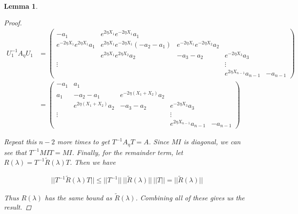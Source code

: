 \documentclass[12pt]{article}
\newtheorem{lemma}{Lemma}
\begin{document}
\begin{lemma}
\begin{proof}
\begin{align*}
U_1^{-1} A_\eta U_1 &= \begin{pmatrix}
-a_1 & e^{2 \eta X_1} e^{-2 \eta X_1} a_1 \\
e^{-2 \eta X_1} e^{2 \eta X_1} a_1 & e^{2 \eta X_1} e^{-2 \eta X_1}(-a_2 - a_1) & e^{-2 \eta X_1}e^{-2 \eta X_2} a_2 \\
& e^{2 \eta X_1} e^{2 \eta X_2} a_2 & -a_3 - a_2 & e^{-2 \eta X_3} a_3 \\
\vdots & & & \vdots \\
& & & e^{2 \eta X_{n-1}} a_{n-1} & -a_{n-1} 
\end{pmatrix}\\
&= \begin{pmatrix}
-a_1 & a_1 \\
a_1 & -a_2 - a_1 & e^{-2 \eta (X_1+X_2)} a_2 \\
& e^{2 \eta (X_1+X_2)} a_2 & -a_3 - a_2 & e^{-2 \eta X_3} a_3 \\
\vdots & & & \vdots \\
& & & e^{2 \eta X_{n-1}} a_{n-1} & -a_{n-1} 
\end{pmatrix}
\end{align*}

Repeat this $n-2$ more times to get $T^{-1} A_\eta T = A$. Since $M I$ is diagonal, we can see that $T^{-1} MI T = MI$. Finally, for the remainder term, let $R(\lambda) = T^{-1} \tilde{R}(\lambda)T$. Then we have 

\begin{align*}
||T^{-1} \tilde{R}(\lambda)T|| \leq ||T^{-1} ||\:|| \tilde{R}(\lambda)||\:||T|| = || \tilde{R}(\lambda)||
\end{align*}

Thus $R(\lambda)$ has the same bound as $\tilde{R}(\lambda)$. Combining all of these gives us the result.

\end{proof}

\end{lemma}



\end{document}
